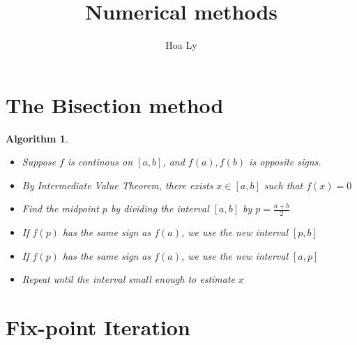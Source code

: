 \documentclass[12pt]{article}
\title{Numerical methods }
\author{Hoa Ly}
\newtheorem{alg}[theorem]{Algorithm}
\begin{document}
\maketitle
{}
\tableofcontents
\newpage

\section{The Bisection method}
\begin{alg}
\begin{itemize}
	\item Suppose $f$ is continous on $[a,b]$, and $f(a),f(b)$ is opposite signs.
	\item By Intermediate Value Theorem, there exists $x \in [a,b]$ such that $f(x) = 0$
	\item Find the midpoint $p$ by dividing the interval $[a,b]$ by $p = \frac{a+b}{2}$
	\item If $f(p)$ has the same sign as $f(a)$, we use the new interval $[p,b]$
	\item If $f(p)$ has the same sign as $f(a)$, we use the new interval $[a,p]$
	\item Repeat until the interval small enough to estimate $x$
	
\end{itemize}
\end{alg}






\section{Fix-point Iteration}
\end{document}
